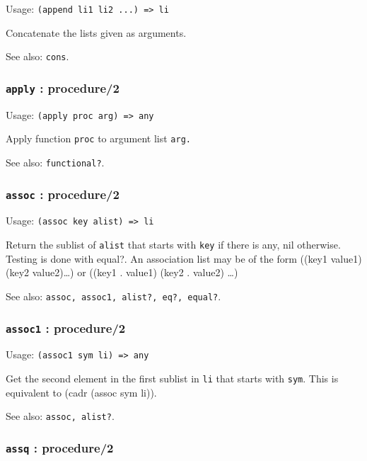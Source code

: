 \documentclass[
]{article}
\newcommand{\passthrough}[1]{#1}
\begin{document}
Usage: \passthrough{\lstinline!(append li1 li2 ...) => li!}

Concatenate the lists given as arguments.

See also: \passthrough{\lstinline!cons!}.

\hypertarget{apply-procedure2}{%
\subsubsection{\texorpdfstring{\texttt{apply} :
procedure/2}{apply : procedure/2}}\label{apply-procedure2}}

Usage: \passthrough{\lstinline!(apply proc arg) => any!}

Apply function \passthrough{\lstinline!proc!} to argument list
\passthrough{\lstinline!arg.!}

See also: \passthrough{\lstinline!functional?!}.

\hypertarget{assoc-procedure2}{%
\subsubsection{\texorpdfstring{\texttt{assoc} :
procedure/2}{assoc : procedure/2}}\label{assoc-procedure2}}

Usage: \passthrough{\lstinline!(assoc key alist) => li!}

Return the sublist of \passthrough{\lstinline!alist!} that starts with
\passthrough{\lstinline!key!} if there is any, nil otherwise. Testing is
done with equal?. An association list may be of the form ((key1
value1)(key2 value2)\ldots) or ((key1 . value1) (key2 . value2) \ldots)

See also: \passthrough{\lstinline!assoc, assoc1, alist?, eq?, equal?!}.

\hypertarget{assoc1-procedure2}{%
\subsubsection{\texorpdfstring{\texttt{assoc1} :
procedure/2}{assoc1 : procedure/2}}\label{assoc1-procedure2}}

Usage: \passthrough{\lstinline!(assoc1 sym li) => any!}

Get the second element in the first sublist in
\passthrough{\lstinline!li!} that starts with
\passthrough{\lstinline!sym!}. This is equivalent to (cadr (assoc sym
li)).

See also: \passthrough{\lstinline!assoc, alist?!}.

\hypertarget{assq-procedure2}{%
\subsubsection{\texorpdfstring{\texttt{assq} :
procedure/2}{assq : procedure/2}}\label{assq-procedure2}}
\end{document}
